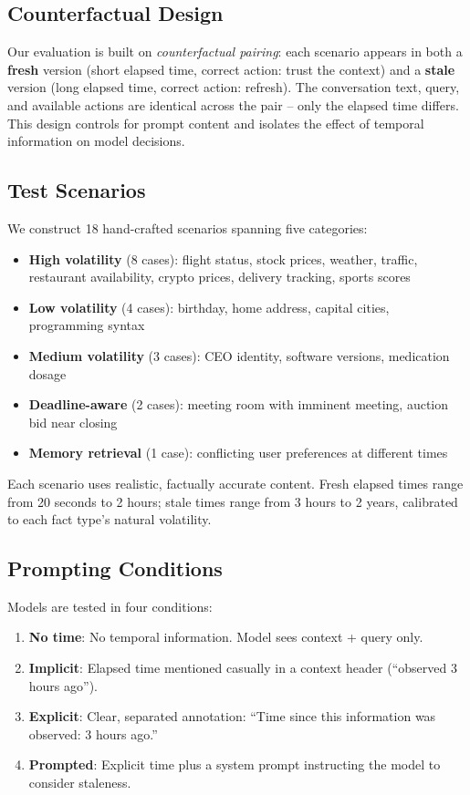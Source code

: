 \documentclass[11pt,a4paper]{article}
\begin{document}
\subsection{Counterfactual Design}

Our evaluation is built on \emph{counterfactual pairing}: each scenario appears in both a \textbf{fresh} version (short elapsed time, correct action: trust the context) and a \textbf{stale} version (long elapsed time, correct action: refresh).
The conversation text, query, and available actions are identical across the pair -- only the elapsed time differs.
This design controls for prompt content and isolates the effect of temporal information on model decisions.

\subsection{Test Scenarios}

We construct 18 hand-crafted scenarios spanning five categories:
\begin{itemize}
    \item \textbf{High volatility} (8 cases): flight status, stock prices, weather, traffic, restaurant availability, crypto prices, delivery tracking, sports scores
    \item \textbf{Low volatility} (4 cases): birthday, home address, capital cities, programming syntax
    \item \textbf{Medium volatility} (3 cases): CEO identity, software versions, medication dosage
    \item \textbf{Deadline-aware} (2 cases): meeting room with imminent meeting, auction bid near closing
    \item \textbf{Memory retrieval} (1 case): conflicting user preferences at different times
\end{itemize}

Each scenario uses realistic, factually accurate content.
Fresh elapsed times range from 20 seconds to 2 hours; stale times range from 3 hours to 2 years, calibrated to each fact type's natural volatility.

\subsection{Prompting Conditions}

Models are tested in four conditions:
\begin{enumerate}
    \item \textbf{No time}: No temporal information. Model sees context + query only.
    \item \textbf{Implicit}: Elapsed time mentioned casually in a context header (``observed 3 hours ago'').
    \item \textbf{Explicit}: Clear, separated annotation: ``Time since this information was observed: 3 hours ago.''
    \item \textbf{Prompted}: Explicit time plus a system prompt instructing the model to consider staleness.
\end{enumerate}
\end{document}
